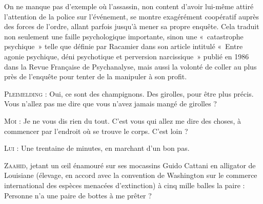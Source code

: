 \label{rat:20}%
%
%
\noindent On ne manque pas d’exemple où l’assassin, non content d’avoir lui-même attiré l’attention de la police sur l’événement, se montre exagérément coopératif auprès des forces de l’ordre, allant parfois jusqu’à mener sa propre enquête. Cela traduit non seulement une faille psychologique importante, sinon une «~catastrophe psychique~» telle que définie par Racamier dans son article intitulé «~Entre agonie psychique, déni psychotique et perversion narcissique~» publié en 1986 dans la Revue Française de Psychanalyse, mais aussi la volonté de coller au plus près de l’enquête pour tenter de la manipuler à son profit.

\begin{dialogue}

\textsc{Pleimelding} : Oui, ce sont des champignons. Des girolles, pour être plus précis. Vous n’allez pas me dire que vous n’avez jamais mangé de girolles ?

\textsc{Moi} : Je ne vous dis rien du tout. C’est vous qui allez me dire des choses, à commencer par l’endroit où se trouve le corps. C’est loin ?

\textsc{Lui} : Une trentaine de minutes, en marchant d’un bon pas.

\textsc{Zaahid}, jetant un œil énamouré sur ses mocassins Guido Cattani en alligator de Louisiane (élevage, en accord avec la convention de Washington sur le commerce international des espèces menacées d’extinction) à cinq mille balles la paire : Personne n’a une paire de bottes à me prêter ?

\end{dialogue}

